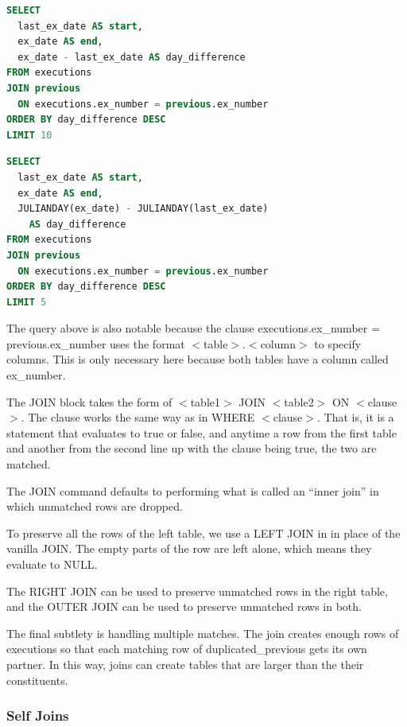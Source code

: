 \documentclass{article}
\begin{document}
\vspace{8pt} \begin{lstlisting}[language=SQL]
SELECT
  last_ex_date AS start,
  ex_date AS end,
  ex_date - last_ex_date AS day_difference
FROM executions
JOIN previous
  ON executions.ex_number = previous.ex_number
ORDER BY day_difference DESC
LIMIT 10
\end{lstlisting} \vspace{8pt}

\vspace{8pt} \begin{lstlisting}[language=SQL]
SELECT
  last_ex_date AS start,
  ex_date AS end,
  JULIANDAY(ex_date) - JULIANDAY(last_ex_date)
    AS day_difference
FROM executions
JOIN previous
  ON executions.ex_number = previous.ex_number
ORDER BY day_difference DESC
LIMIT 5
\end{lstlisting} \vspace{8pt}

The query above is also notable because the clause executions.ex\_number = previous.ex\_number uses the format $<$table$>$.$<$column$>$ to specify columns. This is only necessary here because both tables have a column called ex\_number.

The JOIN block takes the form of $<$table1$>$ JOIN $<$table2$>$ ON $<$clause$>$. The clause works the same way as in WHERE $<$clause$>$. That is, it is a statement that evaluates to true or false, and anytime a row from the first table and another from the second line up with the clause being true, the two are matched.

The JOIN command defaults to performing what is called an ``inner join” in which unmatched rows are dropped.

To preserve all the rows of the left table, we use a LEFT JOIN in in place of the vanilla JOIN. The empty parts of the row are left alone, which means they evaluate to NULL.

The RIGHT JOIN can be used to preserve unmatched rows in the right table, and the OUTER JOIN can be used to preserve unmatched rows in both.

The final subtlety is handling multiple matches. The join creates enough rows of executions so that each matching row of duplicated\_previous gets its own partner. In this way, joins can create tables that are larger than the their constituents.

\subsubsection{Self Joins }
\end{document}

